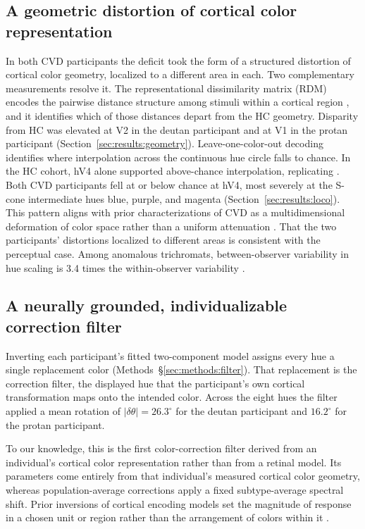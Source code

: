 \subsection{A geometric distortion of cortical color representation}
In both CVD participants the deficit took the form of a structured distortion of cortical color geometry, localized to a different area in each. Two complementary measurements resolve it. The representational dissimilarity matrix (RDM) encodes the pairwise distance structure among stimuli within a cortical region \parencite{kriegeskorte2008}, and it identifies which of those distances depart from the HC geometry. Disparity from HC was elevated at V2 in the deutan participant and at V1 in the protan participant (Section~\ref{sec:results:geometry}). Leave-one-color-out decoding identifies where interpolation across the continuous hue circle falls to chance. In the HC cohort, hV4 alone supported above-chance interpolation, replicating \textcite{brouwer2009}. Both CVD participants fell at or below chance at hV4, most severely at the S-cone intermediate hues blue, purple, and magenta (Section~\ref{sec:results:loco}). This pattern aligns with prior characterizations of CVD as a multidimensional deformation of color space rather than a uniform attenuation \parencite{boehm2014, ohkoba2021, emery2021}. That the two participants' distortions localized to different areas is consistent with the perceptual case. Among anomalous trichromats, between-observer variability in hue scaling is 3.4 times the within-observer variability \parencite{emery2021}.

\subsection{A neurally grounded, individualizable correction filter}
Inverting each participant's fitted two-component model assigns every hue a single replacement color (Methods~\S\ref{sec:methods:filter}). That replacement is the correction filter, the displayed hue that the participant's own cortical transformation maps onto the intended color. Across the eight hues the filter applied a mean rotation of $|\delta\theta| = 26.3^\circ$ for the deutan participant and $16.2^\circ$ for the protan participant.

To our knowledge, this is the first color-correction filter derived from an individual's cortical color representation rather than from a retinal model. Its parameters come entirely from that individual's measured cortical color geometry, whereas population-average corrections apply a fixed subtype-average spectral shift. Prior inversions of cortical encoding models set the magnitude of response in a chosen unit or region rather than the arrangement of colors within it \parencite{bashivan2019, shinkle2025}.

